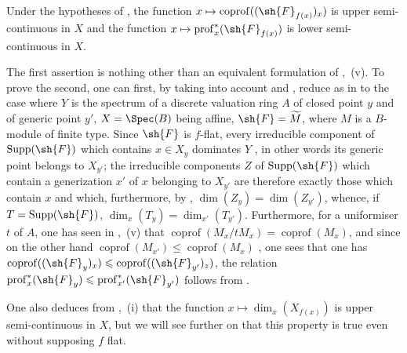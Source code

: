 \begin{corollary}[12.1.3]
\label{IV.12.1.3}
Under the hypotheses of , the function $x\mapsto\operatorname{coprof}((\sh{F}_{f(x)})_x)$ is upper semi-continuous in $X$ and the function $x\mapsto\operatorname{prof}_x^*(\sh{F}_{f(x)})$  is lower semi-continuous in $X$.
\end{corollary}

The first assertion is nothing other than an equivalent formulation of ,~(v).
To prove the second, one can first, by taking into account  and , reduce as in  to the case where $Y$ is the spectrum of a discrete valuation ring $A$ of closed point $y$ and of generic point $y'$, $X=\Spec(B)$ being affine, $\sh{F}=\widetilde{M}$, where $M$ is a $B$-module of finite type.
Since $\sh{F}$ is $f$-flat, every irreducible component of $\operatorname{Supp}(\sh{F})$ which contains $x\in X_y$ dominates $Y$ , in other words its generic point belongs to $X_{y'}$; the irreducible components $Z$ of $\operatorname{Supp}(\sh{F})$ which contain a generization $x'$ of $x$ belonging to $X_{y'}$ are therefore exactly those which contain $x$ and which, furthermore, by , $\dim(Z_y)=\dim(Z_{y'})$, whence, if $T=\operatorname{Supp}(\sh{F})$, $\dim_x(T_y)=\dim_{x'}(T_{y'})$.
Furthermore, for a uniformiser $t$ of $A$, one has seen in ,~(v) that $\operatorname{coprof}(M_x/tM_x)=\operatorname{coprof}(M_x)$, and since on the other hand $\operatorname{coprof}(M_{x'})\leqslant\operatorname{coprof}(M_x)$ , one sees that one has $\operatorname{coprof}((\sh{F}_y)_x)\leqslant\operatorname{coprof}((\sh{F}_{y'})_z)$, the relation $\operatorname{prof}_x^*(\sh{F}_y)\leqslant\operatorname{prof}_{x'}^*(\sh{F}_{y'})$ follows from .

\begin{remark}[12.1.4]
\label{IV.12.1.4}
One also deduces from ,~(i) that the function $x\mapsto\dim_x(X_{f(x)})$ is upper semi-continuous in $X$, but we will see further on  that this property is true even without supposing $f$ flat.
\end{remark}

